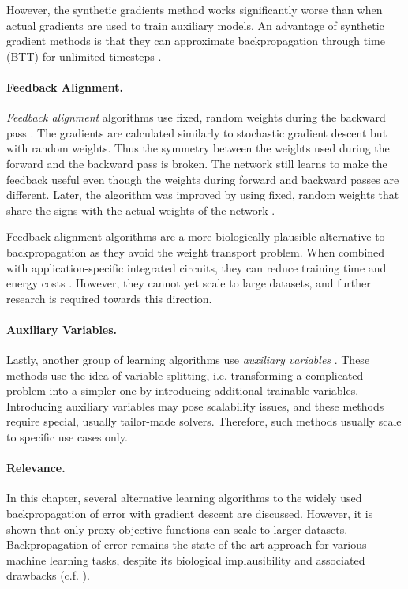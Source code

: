 However, the synthetic gradients method works significantly worse than when actual gradients are used to train auxiliary models.
An advantage of synthetic gradient methods is that they can approximate backpropagation through time (BTT) for unlimited timesteps \cite{jaderberg_decoupled_2017}.

\paragraph{Feedback Alignment.} \emph{Feedback alignment} algorithms use fixed, random weights during the backward pass .
The gradients are calculated similarly to stochastic gradient descent but with random weights.
Thus the symmetry between the weights used during the forward and the backward pass is broken.
The network still learns to make the feedback useful even though the weights during forward and backward passes are different. 
Later, the algorithm was improved by using fixed, random weights that share the signs with the actual weights of the network .

Feedback alignment algorithms are a more biologically plausible alternative to backpropagation as they avoid the weight transport problem.
When combined with application-specific integrated circuits, they can reduce training time and energy costs \cite{lillicrap_random_2016}.
However, they cannot yet scale to large datasets, and further research is required towards this direction.

\paragraph{Auxiliary Variables.} Lastly, another group of learning algorithms use \emph{auxiliary variables} .
These methods use the idea of variable splitting, i.e. transforming a complicated problem into a simpler one by introducing additional trainable variables.
Introducing auxiliary variables may pose scalability issues, and these methods require special, usually tailor-made solvers.
Therefore, such methods usually scale to specific use cases only.

\paragraph{Relevance.} In this chapter, several alternative learning algorithms to the widely used backpropagation of error with gradient descent are discussed. However, it is shown that only proxy objective functions can scale to larger datasets. Backpropagation of error remains the state-of-the-art approach for various machine learning tasks, despite its biological implausibility and associated drawbacks (c.f. ).

